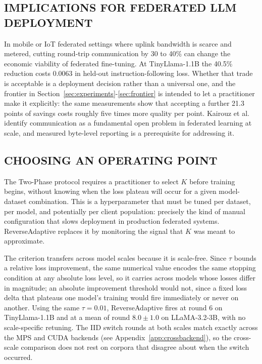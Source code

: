 \subsection{IMPLICATIONS FOR FEDERATED LLM DEPLOYMENT}
In mobile or IoT federated settings where uplink bandwidth is scarce and metered, cutting round-trip communication by 30 to 40\% can change the economic viability of federated fine-tuning. At TinyLlama-1.1B the 40.5\% reduction costs 0.0063 in held-out instruction-following loss. Whether that trade is acceptable is a deployment decision rather than a universal one, and the frontier in Section~\ref{sec:experiments}-\ref{sec:frontier} is intended to let a practitioner make it explicitly: the same measurements show that accepting a further 21.3 points of savings costs roughly five times more quality per point. Kairouz et al. \cite{kairouz2021advances} identify communication as a fundamental open problem in federated learning at scale, and measured byte-level reporting is a prerequisite for addressing it.

\subsection{CHOOSING AN OPERATING POINT}
The Two-Phase protocol requires a practitioner to select $K$ before training begins, without knowing when the loss plateau will occur for a given model-dataset combination. This is a hyperparameter that must be tuned per dataset, per model, and potentially per client population: precisely the kind of manual configuration that slows deployment in production federated systems. ReverseAdaptive replaces it by monitoring the signal that $K$ was meant to approximate.

The criterion transfers across model scales because it is scale-free. Since $\tau$ bounds a relative loss improvement, the same numerical value encodes the same stopping condition at any absolute loss level, so it carries across models whose losses differ in magnitude; an absolute improvement threshold would not, since a fixed loss delta that plateaus one model's training would fire immediately or never on another. Using the same $\tau{=}0.01$, ReverseAdaptive fires at round 6 on TinyLlama-1.1B and at a mean of round $8.0 \pm 1.0$ on LLaMA-3.2-3B, with no scale-specific retuning. The IID switch rounds at both scales match exactly across the MPS and CUDA backends (see Appendix~\ref{app:crossbackend}), so the cross-scale comparison does not rest on corpora that disagree about when the switch occurred.

